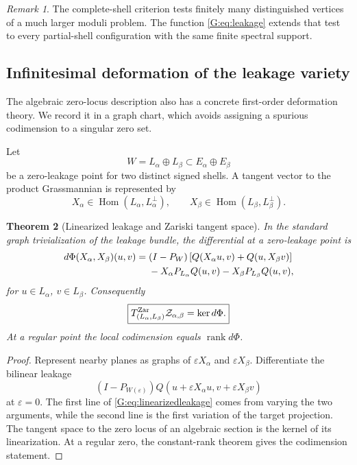 \documentclass[
 aps,
 prd,
 reprint,
 amsmath,
 amssymb,
 nofootinbib,
 superscriptaddress
]{revtex4-2}
\newtheorem{theorem}{Theorem}[section]
\theoremstyle{definition}
\theoremstyle{remark}
\newtheorem{remark}[theorem]{Remark}
\begin{document}
\begin{remark}
The complete-shell criterion tests finitely many distinguished vertices of a
much larger moduli problem.  The function \eqref{G:eq:leakage} extends that
test to every partial-shell configuration with the same finite spectral
support.
\end{remark}

\subsection{Infinitesimal deformation of the leakage variety}

The algebraic zero-locus description also has a concrete first-order
deformation theory.  We record it in a graph chart, which avoids assigning a
spurious codimension to a singular zero set.

Let
\[
 W=L_\alpha\oplus L_\beta
 \subset E_\alpha\oplus E_\beta
\]
be a zero-leakage point for two distinct signed shells.  A tangent vector to
the product Grassmannian is represented by
\[
 X_\alpha\in\operatorname{Hom}(L_\alpha,L_\alpha^\perp),
 \qquad
 X_\beta\in\operatorname{Hom}(L_\beta,L_\beta^\perp).
\]

\begin{theorem}[Linearized leakage and Zariski tangent space]
\label{G:thm:linearizedleakage}
In the standard graph trivialization of the leakage bundle, the differential
at a zero-leakage point is
\begin{align}
 d\Phi(X_\alpha,X_\beta)(u,v)
 ={}&
 (I-P_W)
 \left[
 Q(X_\alpha u,v)+Q(u,X_\beta v)
 \right]
 \notag\\
 &-
 X_\alpha P_{L_\alpha}Q(u,v)
 -
 X_\beta P_{L_\beta}Q(u,v),
 \label{G:eq:linearizedleakage}
\end{align}
for \(u\in L_\alpha\), \(v\in L_\beta\).  Consequently
\begin{equation}
 \boxed{
 T_{(L_\alpha,L_\beta)}^{\rm Zar}\mathcal Z_{\alpha,\beta}
 =
 \ker d\Phi.
 }
 \label{G:eq:zartangent}
\end{equation}
At a regular point the local codimension equals
\(\operatorname{rank}d\Phi\).
\end{theorem}

\begin{proof}
Represent nearby planes as graphs of
\(\varepsilon X_\alpha\) and \(\varepsilon X_\beta\).
Differentiate the bilinear leakage
\[
 (I-P_{W(\varepsilon)})
 Q(u+\varepsilon X_\alpha u,
   v+\varepsilon X_\beta v)
\]
at \(\varepsilon=0\).  The first line of
\eqref{G:eq:linearizedleakage} comes from varying the two arguments, while the
second line is the first variation of the target projection.  The tangent
space to the zero locus of an algebraic section is the kernel of its
linearization.  At a regular zero, the constant-rank theorem gives the
codimension statement.
\end{proof}
\end{document}
